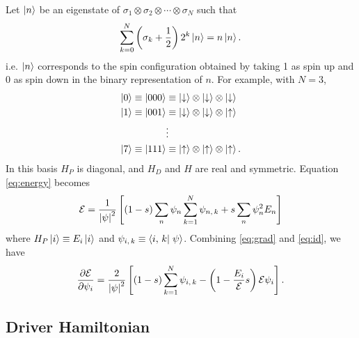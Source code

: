 Let $\left| n \right>$ be an eigenstate of
$\sigma_1 \otimes \sigma_2 \otimes \cdots \otimes \sigma_N$
such that
\begin{equation}
    \sum_{k=0}^N \left( \sigma_k + \frac{1}{2} \right) 2^k \left| n \right> = n \left| n \right>.
  \label{}
\end{equation}
i.e. $\left| n \right>$ corresponds to the spin configuration obtained by taking 1
as spin up and 0 as spin down in the binary representation of $n$.
For example, with $N=3$,
\begin{align*}
  \left| 0 \right> \equiv \left| 000 \right>
  &\equiv
  \left| \downarrow \right> \otimes
  \left| \downarrow \right> \otimes
  \left| \downarrow \right> \\
  \left| 1 \right> \equiv \left| 001 \right>
  &\equiv
  \left| \downarrow \right> \otimes
  \left| \downarrow \right> \otimes
  \left| \uparrow \right> \\
  &\vdots \\
  \left| 7 \right> \equiv \left| 111 \right>
  &\equiv
  \left| \uparrow \right> \otimes
  \left| \uparrow \right> \otimes
  \left| \uparrow \right>.
  \label{}
\end{align*}
In this basis $H_P$ is diagonal, and $H_D$ and $H$ are real and symmetric.
Equation \eqref{eq:energy} becomes
\begin{equation}
  \mathcal{E}
  = \frac{1}{\left| \psi \right|^2} \left[ (1-s) \sum_n \psi_n \sum_{k=1}^N \psi_{n,\,k} + s \sum_n \psi_n^2 E_n \right]
  \label{}
\end{equation}
where
$H_P \left| i \right> \equiv E_i \left| i \right>$
and
$\psi_{\nghbr{i}{k}} \equiv \braket{\nghbr{i}{k}}{\psi}$.
Combining \eqref{eq:grad} and \eqref{eq:id}, we have 
\begin{equation}
  \frac{\partial \mathcal{E}}{\partial \psi_i}
  = \frac{2}{\left| \psi \right|^2}
  \left[
      (1-s) \sum_{k=1}^N \psi_{i,\,k}
    - \left( 1 - \frac{E_i}{\mathcal{E}} s \right) \mathcal{E} \psi_i
  \right].
\end{equation}

\subsection{Driver Hamiltonian}

